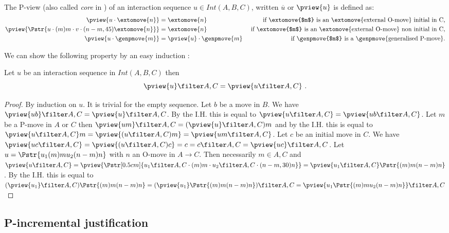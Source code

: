 The P-view (also called \emph{core} in
\cite{McCusker-GamesandFullAbstrac}) of an interaction sequence $u
\in Int(A,B,C)$, written $\overline{u}$ or $\pview{u}$ is defined
as:
\begin{align*}
\pview{u\cdot \extomove{n}} &= \extomove{n} &
\mbox{ if \extomove{$m$} is an \extomove{external O-move} initial in C,}\\
\pview{\Pstr{u\cdot (m)m\cdot v \cdot (n-m,45){\extomove{n}} }} &= \extomove{n} &\mbox{ if \extomove{$m$} is an \extomove{external O-move} non initial in C,}\\
\pview{u \cdot \genpmove{m}} &= \pview{u}\cdot \genpmove{m}  & \mbox{ if \genpmove{$m$} is a \genpmove{generalised P-move}.}\\
\end{align*}

We can show the following property by an easy induction :
\begin{lemma}
\label{lem:pviewAC_eq_ACpview}
 Let $u$ be an interaction sequence in $Int(A,B,C)$ then
$$\pview{u} \filter A,C = \pview{u \filter A,C} \ .$$
\end{lemma}
\begin{proof}
  By induction on $u$. It is trivial for the empty sequence.
Let $b$ be a move in $B$. We have $\pview{u b} \filter A,C =
\pview{u} \filter A,C$. By the I.H. this is equal to $\pview{u
\filter A,C} = \pview{u b\filter A,C}$. Let $m$ be a P-move in $A$
or $C$ then $\pview{u m} \filter A,C = (\pview{u} \filter A,C) m$
and by the I.H. this is equal to $\pview{u \filter A,C} m =
\pview{(u \filter A,C) m} = \pview{u m \filter A,C}$. Let $c$ be an
initial move in $C$. We have $\pview{u c \filter A,C}  = \pview{(u
\filter A,C) c} = c =  c \filter A,C = \pview{u c} \filter A,C$. Let
$u = \Pstr{u_1 (m){m} u_2 (n-m){n}}$ with $n$ an O-move in
$A\rightarrow C$. Then necessarily $m\in A,C$ and $ \pview{u\filter
A,C} = \pview{\Pstr[0.5cm]{u_1\filter A,C \cdot (m){m} \cdot
u_2\filter A,C \cdot (n-m,30){n}}} =
 \pview{u_1 \filter A,C} \Pstr{(m){m} (n-m){n}}$. By the I.H. this is equal to
$(\pview{u_1}\filter A,C) \Pstr{(m){m} (n-m){n}} = (\pview{u_1}
\Pstr{(m){m} (n-m){n}} ) \filter A,C  = \pview{u_1 \Pstr{(m){m} u_2
(n-m){n}}} \filter A,C$
\end{proof}


\subsection{P-incremental justification}


